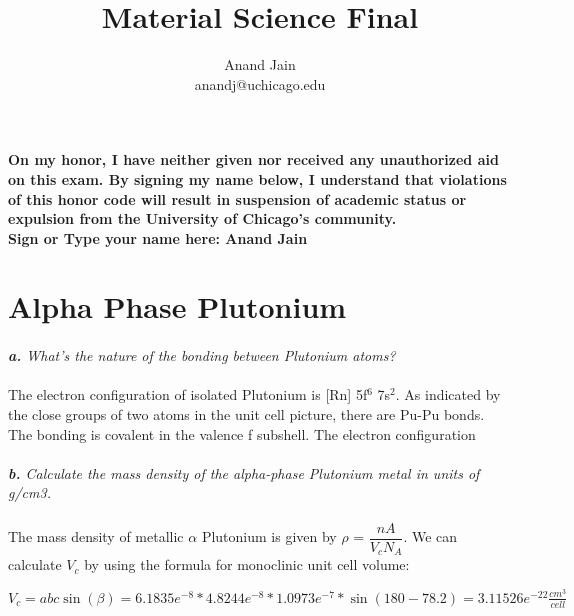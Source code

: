 \documentclass[letterpaper]{article}
\begin{document}
\title{Material Science Final}
\author{Anand Jain \\ anandj@uchicago.edu}
\maketitle
\paragraph{}
    \textbf{On my honor, I have neither given nor received any unauthorized aid on this exam. By signing my name below, I understand that violations of this honor code will result in suspension of academic status or expulsion from the University of Chicago’s community.  \\
    Sign or Type your name here: Anand Jain}
\section{Alpha Phase Plutonium}
    \paragraph{}
        \textit{
            \textbf{a.} 
            What's the nature of the bonding between Plutonium atoms?
        }
    \paragraph{}
        The electron configuration of isolated Plutonium is [Rn] 5f$^{6}$ 7s$^{2}$. 
        As indicated by the close groups of two atoms in the unit cell picture, there are Pu-Pu bonds.
        The bonding is covalent in the valence f subshell. The electron configuration


    \paragraph{}
    \textit{
        \textbf{b.} 
        Calculate the mass density of the alpha-phase Plutonium metal in units of g/cm3.
        }

    \paragraph{}
        The mass density of metallic $\alpha$ Plutonium is given by $\rho$ = $\dfrac{nA}{V_{c}N_{A}}$.
        We can calculate $V_{c}$ by using the formula for monoclinic unit cell volume: 
        
        $V_{c} = abc\sin{(\beta)} = 6.1835e^{-8} * 4.8244e^{-8} * 1.0973e^{-7} * \sin{(180 - 78.2)} = 3.11526e^{-22}\frac{cm^{3}}{cell}$
        
\end{document}
